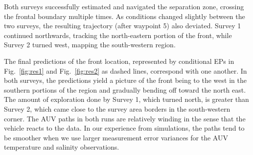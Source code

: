\documentclass[aoas]{imsart}
\begin{document}
Both surveys successfully estimated and navigated the separation zone,
crossing the frontal boundary multiple times. As conditions changed
slightly between the two surveys, the resulting trajectory (after
waypoint 5) also deviated. Survey 1 continued northwards,
tracking the north-eastern portion of the front, while Survey 2 turned
west, mapping the south-western region.

The final predictions of the front location, represented by
conditional EPs in Fig.~\ref{fig:res1} and Fig.~\ref{fig:res2} as
dashed lines, correspond with one another. In both surveys, the predictions yield a picture of the front being to the west in the southern portions of
the region and gradually bending off toward the north east. The amount
of exploration done by Survey 1, which turned north, is greater than
Survey 2, which came close to the survey area borders in the
south-western corner. The AUV paths in both runs are relatively
winding in the sense that the vehicle reacts to the data. In our
experience from simulations, the paths tend to be smoother when we
use larger measurement error variances for the AUV temperature and salinity observations. 
\end{document}
